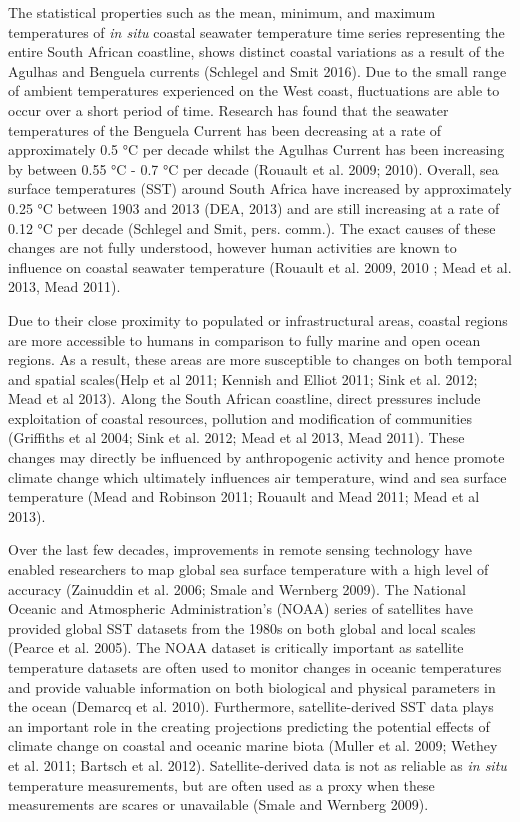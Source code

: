 \documentclass[12pt,]{article}
\begin{document}
The statistical properties such as the mean, minimum, and maximum
temperatures of \emph{in situ} coastal seawater temperature time series
representing the entire South African coastline, shows distinct coastal
variations as a result of the Agulhas and Benguela currents (Schlegel
and Smit 2016). Due to the small range of ambient temperatures
experienced on the West coast, fluctuations are able to occur over a
short period of time. Research has found that the seawater temperatures
of the Benguela Current has been decreasing at a rate of approximately
0.5 °C per decade whilst the Agulhas Current has been increasing by
between 0.55 °C - 0.7 °C per decade (Rouault et al. 2009; 2010).
Overall, sea surface temperatures (SST) around South Africa have
increased by approximately 0.25 °C between 1903 and 2013 (DEA, 2013) and
are still increasing at a rate of 0.12 °C per decade (Schlegel and Smit,
pers. comm.). The exact causes of these changes are not fully
understood, however human activities are known to influence on coastal
seawater temperature (Rouault et al. 2009, 2010 ; Mead et al. 2013, Mead
2011).

Due to their close proximity to populated or infrastructural areas,
coastal regions are more accessible to humans in comparison to fully
marine and open ocean regions. As a result, these areas are more
susceptible to changes on both temporal and spatial scales(Help et al
2011; Kennish and Elliot 2011; Sink et al. 2012; Mead et al 2013). Along
the South African coastline, direct pressures include exploitation of
coastal resources, pollution and modification of communities (Griffiths
et al 2004; Sink et al. 2012; Mead et al 2013, Mead 2011). These changes
may directly be influenced by anthropogenic activity and hence promote
climate change which ultimately influences air temperature, wind and sea
surface temperature (Mead and Robinson 2011; Rouault and Mead 2011; Mead
et al 2013).

Over the last few decades, improvements in remote sensing technology
have enabled researchers to map global sea surface temperature with a
high level of accuracy (Zainuddin et al. 2006; Smale and Wernberg 2009).
The National Oceanic and Atmospheric Administration's (NOAA) series of
satellites have provided global SST datasets from the 1980s on both
global and local scales (Pearce et al. 2005). The NOAA dataset is
critically important as satellite temperature datasets are often used to
monitor changes in oceanic temperatures and provide valuable information
on both biological and physical parameters in the ocean (Demarcq et al.
2010). Furthermore, satellite-derived SST data plays an important role
in the creating projections predicting the potential effects of climate
change on coastal and oceanic marine biota (Muller et al. 2009; Wethey
et al. 2011; Bartsch et al. 2012). Satellite-derived data is not as
reliable as \emph{in situ} temperature measurements, but are often used
as a proxy when these measurements are scares or unavailable (Smale and
Wernberg 2009).
\end{document}
